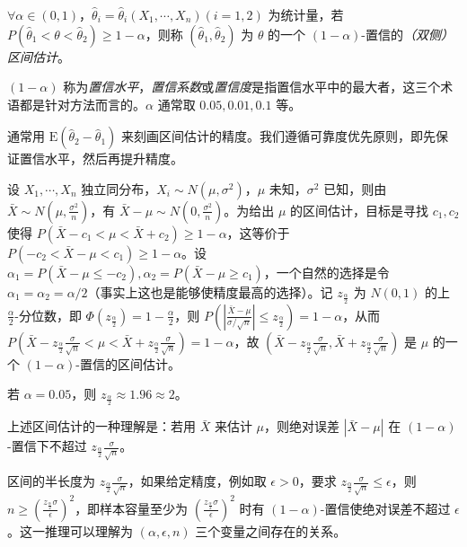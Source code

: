 \documentclass[../main.tex]{subfiles}
\begin{document}
\begin{definition}\label{def:6.4.1}
    $\forall\alpha\in(0,1)$，$\hat\theta_i=\hat\theta_i(X_1,\cdots,X_n)(i=1,2)$ 为统计量，若 $P(\hat\theta_1<\theta<\hat\theta_2)\geq1-\alpha$，则称 $(\hat\theta_1,\hat\theta_2)$ 为 $\theta$ 的一个 $(1-\alpha)$-置信的\emph{（双侧）区间估计}。
\end{definition}

$(1-\alpha)$ 称为\emph{置信水平}，\emph{置信系数}或\emph{置信度}是指置信水平中的最大者，这三个术语都是针对方法而言的。$\alpha$ 通常取 $0.05,0.01,0.1$ 等。

通常用 $\mathrm E(\hat\theta_2-\hat\theta_1)$ 来刻画区间估计的精度。我们遵循可靠度优先原则，即先保证置信水平，然后再提升精度。

\begin{example}
    设 $X_1,\cdots,X_n$ 独立同分布，$X_i\sim N(\mu,\sigma^2)$，$\mu$ 未知，$\sigma^2$ 已知，则由 $\bar X\sim N(\mu,\frac{\sigma^2}n)$，有 $\bar X-\mu\sim N(0,\frac{\sigma^2}n)$。为给出 $\mu$ 的区间估计，目标是寻找 $c_1,c_2$ 使得 $P(\bar X-c_1<\mu<\bar X+c_2)\geq1-\alpha$，这等价于 $P(-c_2<\bar X-\mu<c_1)\geq1-\alpha$。设 $\alpha_1=P(\bar X-\mu\leq-c_2),\alpha_2=P(\bar X-\mu\geq c_1)$，一个自然的选择是令 $\alpha_1=\alpha_2=\alpha/2$（事实上这也是能够使精度最高的选择）。记 $z_{\frac\alpha2}$ 为 $N(0,1)$ 的上 $\frac\alpha2$-分位数，即 $\Phi(z_{\frac\alpha2})=1-\frac\alpha2$，则 $P(\left|\frac{\bar X-\mu}{\sigma/\sqrt n}\right|\leq z_{\frac\alpha2})=1-\alpha$，从而 $P(\bar X-z_{\frac\alpha2}\frac\sigma{\sqrt n}<\mu<\bar X+z_{\frac\alpha2}\frac\sigma{\sqrt n})=1-\alpha$，故 $(\bar X-z_{\frac\alpha2}\frac\sigma{\sqrt n},\bar X+z_{\frac\alpha2}\frac\sigma{\sqrt n})$ 是 $\mu$ 的一个 $(1-\alpha)$-置信的区间估计。
\end{example}

若 $\alpha=0.05$，则 $z_{\frac\alpha2}\approx1.96\approx2$。

上述区间估计的一种理解是：若用 $\bar X$ 来估计 $\mu$，则绝对误差 $|\bar X-\mu|$ 在 $(1-\alpha)$-置信下不超过 $z_{\frac\alpha2}\frac\sigma{\sqrt n}$。

区间的半长度为 $z_{\frac\alpha2}\frac\sigma{\sqrt n}$，如果给定精度，例如取 $\epsilon>0$，要求 $z_{\frac\alpha2}\frac\sigma{\sqrt n}\leq\epsilon$，则 $n\geq(\frac{z_{\frac\alpha2}\sigma}\epsilon)^2$，即样本容量至少为 $(\frac{z_{\frac\alpha2}\sigma}\epsilon)^2$ 时有 $(1-\alpha)$-置信使绝对误差不超过 $\epsilon$。这一推理可以理解为 $(\alpha,\epsilon,n)$ 三个变量之间存在的关系。
\end{document}
